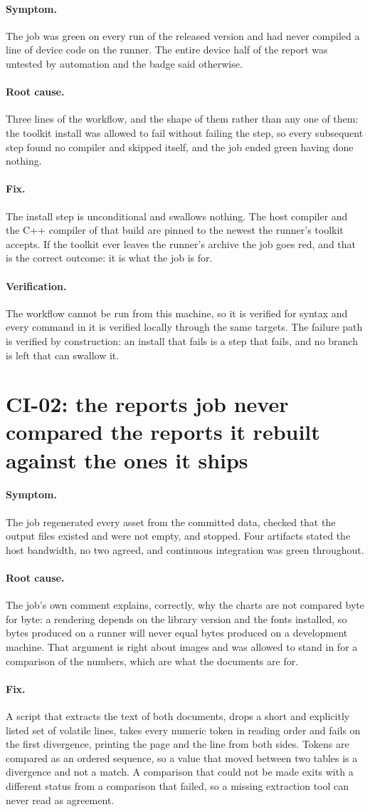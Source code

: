 \documentclass[11pt,a4paper]{report}
\newcommand{\symptom}[1]{\paragraph{Symptom.}#1}
\newcommand{\rootcause}[1]{\paragraph{Root cause.}#1}
\newcommand{\fix}[1]{\paragraph{Fix.}#1}
\newcommand{\verification}[1]{\paragraph{Verification.}#1}
\begin{document}
\symptom{The job was green on every run of the released version and had never
compiled a line of device code on the runner. The entire device half of the
report was untested by automation and the badge said otherwise.}

\rootcause{Three lines of the workflow, and the shape of them rather than any one
of them: the toolkit install was allowed to fail without failing the step, so
every subsequent step found no compiler and skipped itself, and the job ended
green having done nothing.}

\fix{The install step is unconditional and swallows nothing. The host compiler
and the C++ compiler of that build are pinned to the newest the runner's toolkit
accepts. If the toolkit ever leaves the runner's archive the job goes red, and
that is the correct outcome: it is what the job is for.}

\verification{The workflow cannot be run from this machine, so it is verified for
syntax and every command in it is verified locally through the same targets. The
failure path is verified by construction: an install that fails is a step that
fails, and no branch is left that can swallow it.}

\section{CI-02: the reports job never compared the reports it rebuilt against the ones it ships}

\symptom{The job regenerated every asset from the committed data, checked that
the output files existed and were not empty, and stopped. Four artifacts stated
the host bandwidth, no two agreed, and continuous integration was green
throughout.}

\rootcause{The job's own comment explains, correctly, why the charts are not
compared byte for byte: a rendering depends on the library version and the fonts
installed, so bytes produced on a runner will never equal bytes produced on a
development machine. That argument is right about images and was allowed to stand
in for a comparison of the numbers, which are what the documents are for.}

\fix{A script that extracts the text of both documents, drops a short and
explicitly listed set of volatile lines, takes every numeric token in reading
order and fails on the first divergence, printing the page and the line from both
sides. Tokens are compared as an ordered sequence, so a value that moved between
two tables is a divergence and not a match. A comparison that could not be made
exits with a different status from a comparison that failed, so a missing
extraction tool can never read as agreement.}
\end{document}

